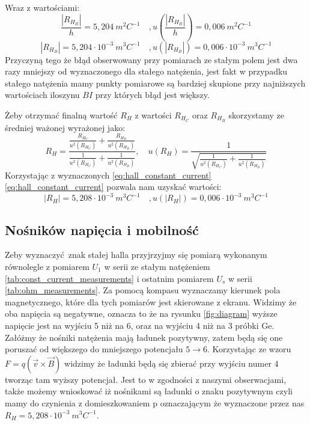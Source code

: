 \documentclass[12pt]{article}
\begin{document}
Wraz z wartościami:
\[
    \frac{|R_{H_B}|}{h} = 5{,}204 \ m^2C^{-1} \quad, u(\frac{|R_{H_B}|}{h}) = 0{,}006 \ m^2C^{-1}  
\]
\begin{equation}
    |R_{H_B}| = 5{,}204 \cdot10^{-3} \ m^3C^{-1} \quad, u(|R_{H_B}|) = 0{,}006 \cdot10^{-3} \ m^3C^{-1}  
    \label{eq:hall_constant_field}
\end{equation}
Przyczyną tego że błąd obserwowany przy pomiarach ze stałym polem jest dwa razy mniejszy od wyznaczonego dla stałego natężenia, 
jest fakt w przypadku stałego natężenia mamy punkty pomiarowe są bardziej skupione przy najniższych wartościach iloszynu $BI$ przy których błąd jest większy.


Żeby otrzymać finalną wartość $R_H$ z wartości $R_{H_C}$ oraz $R_{H_B}$ skorzystamy ze średniej ważonej wyrażonej jako:
\[
    R_H = \frac{\frac{R_{H_C}}{u^2(R_{H_C})}+\frac{R_{H_B}}{u^2(R_{H_B})}}{\frac{1}{u^2(R_{H_C})}+\frac{1}{u^2(R_{H_B})}}, \quad u(R_H) = \frac{1}{\sqrt{\frac{1}{u^2(R_{H_C})}+\frac{1}{u^2(R_{H_B})}}}
\]
Korzystając z wyznaczonych \ref{eq:hall_constant_current}\ref{eq:hall_constant_current} pozwala nam uzyskać wartości:
\begin{equation} 
    |R_H| = 5{,}208 \cdot10^{-3} \ m^3C^{-1} \quad, u(|R_H|) = 0{,}006 \cdot10^{-3} \ m^3C^{-1}  
    \label{eq:hall_const}
\end{equation}


\subsection{Nośników napięcia i mobilność}
Zeby wyznaczyć znak stałej halla przyjrzyjmy się pomiarą wykonanym równolegle z pomiarem $U_1$ w serii ze stałym natężeniem \ref{tab:const_current_measurements} i ostatnim pomiarem $U_s$ w serii \ref{tab:ohm_measurements}. 
Za pomocą kompasu wyznaczamy kierunek pola magnetycznego, które dla tych pomiarów jest skierowane z ekranu.
Widzimy że oba napięcia są negatywne, oznacza to że na rysunku \ref{fig:diagram} wyższe napięcie jest na wyjściu 5 niż na 6, oraz na wyjściu 4 niż na 3 próbki Ge.
Załóżmy że nośniki natężenia mają ładunek pozytywny, zatem będą się one poruszać od większego do mniejszego potencjału $5 \rightarrow 6$. 
Korzystając ze wzoru $F=q(\vec{v}\times\vec{B})$ widzimy że ładunki będą się zbierać przy wyjściu numer 4 tworząc tam wyższy potencjał.
Jest to w zgodności z naszymi obserwacjami, także możemy wnioskować iż nośnikami są ładunki o znaku pozytywnym czyli mamy do czynienia z domieszkowaniem p oznaczającym że wyznaczone przez nas $R_H =  5{,}208 \cdot10^{-3} \ m^3C^{-1}$.
\end{document}

